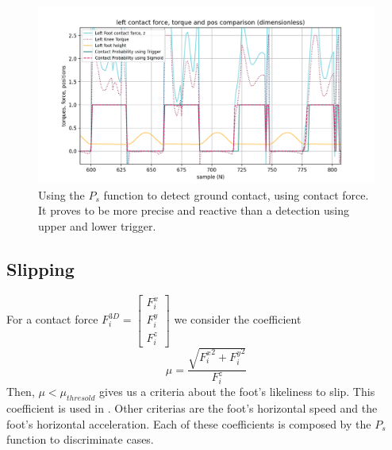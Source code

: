 \documentclass[a4paper,10pt]{article}
\begin{document}
\begin{figure}[H]
\centering
  \includegraphics[width=\linewidth, angle=0, scale=0.8]{./images/Torque_Contact_Detection_Comp_difficile.png}
  \caption{Using the $P_s$ function to detect ground contact, using contact force. \\ It proves to be more precise and reactive than a detection using upper and lower trigger.}
\end{figure}



\subsection{Slipping}
For a contact force $F_i^{3D} = \begin{bmatrix}F_i^x\\ F_i^y\\ F_i^z \end{bmatrix}$  we consider the coefficient \cite{}
$$\mu = \frac{\sqrt{ {F_i^x}^{2} + {F_i^y}^{2}}}{F_i^z} $$
Then, $\mu < \mu_{thresold}$ gives us a criteria about the foot's likeliness to slip. This coefficient is used in \cite{9}. 
Other criterias are the foot's horizontal speed and the foot's horizontal acceleration. 
Each of these coefficients is composed by the $P_s$ function to discriminate cases.
\end{document}
